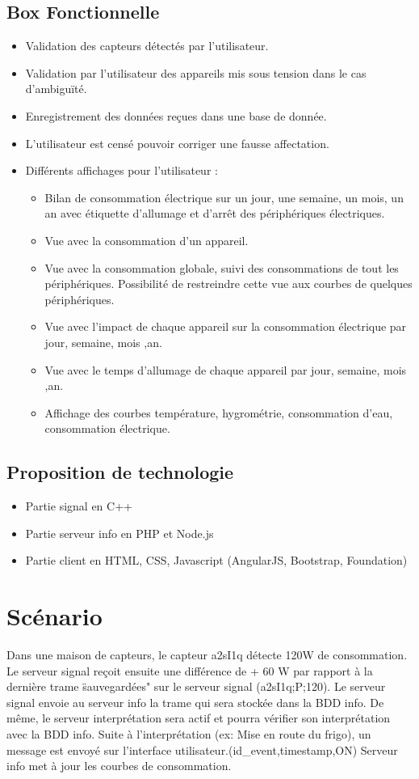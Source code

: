 \documentclass[10pt,a4paper]{article}
\begin{document}
\subsection{Box Fonctionnelle}
\begin{itemize}
  \item Validation des capteurs détectés par l'utilisateur.
  \item Validation par l'utilisateur des appareils mis sous tension dans le cas d'ambiguïté.
  \item Enregistrement des données reçues dans une base de donnée.
  \item L'utilisateur est censé pouvoir corriger une fausse affectation.
  \item Différents affichages pour l'utilisateur :
  \begin{itemize}
    \item Bilan de consommation électrique sur un jour, une semaine, un mois, un an avec étiquette d'allumage et d'arrêt des périphériques électriques.
    \item Vue avec la consommation d'un appareil.
    \item Vue avec la consommation globale, suivi des consommations de tout les périphériques. Possibilité de restreindre cette vue aux courbes de quelques périphériques.
    \item Vue avec l'impact de chaque appareil sur la consommation électrique par jour, semaine, mois ,an.
    \item Vue avec le temps d'allumage de chaque appareil par jour, semaine, mois ,an.
    \item Affichage des courbes température, hygrométrie, consommation d'eau, consommation électrique.
  \end{itemize}
\end{itemize}
\subsection{Proposition de technologie}
\begin{itemize}
\item Partie signal en C++
\item Partie serveur info en PHP et Node.js
\item Partie client en HTML, CSS, Javascript (AngularJS, Bootstrap, Foundation)
\end{itemize}

\section{Scénario}
Dans une maison de capteurs, le capteur a2sI1q détecte 120W de consommation.
Le serveur signal reçoit ensuite une différence de + 60 W par rapport à la dernière trame \"sauvegardées" sur le serveur signal
(a2sI1q;P;120).
Le serveur signal envoie au serveur info la trame qui sera stockée dans la BDD info. De même, le serveur interprétation sera actif et pourra vérifier son interprétation avec la BDD info.
Suite à l'interprétation (ex: Mise en route du frigo), un message est envoyé sur l'interface utilisateur.(id\_event,timestamp,ON)
Serveur info met à jour les courbes de consommation.
\end{document}
